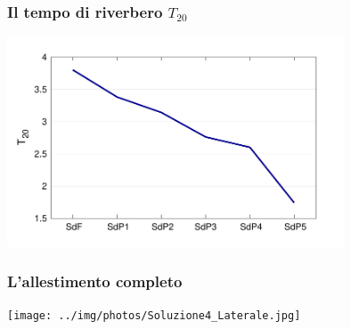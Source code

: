 \documentclass[10pt]{beamer}
\begin{document}
\begin{frame}
  \frametitle{Il tempo di riverbero $T_{20}$}

  \begin{center}

    \includegraphics[width = 10cm]{graph/t20avg.pdf}
  \end{center}

\end{frame}

\begin{frame}
  \frametitle{L'allestimento completo}

  \begin{center}
    \texttt{[image: ../img/photos/Soluzione4\_Laterale.jpg]}
  \end{center}

\end{frame}
\end{document}
